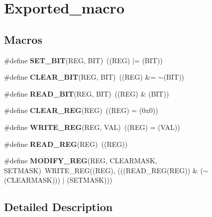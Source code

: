 \hypertarget{group___exported__macro}{\section{Exported\-\_\-macro}
\label{group___exported__macro}
}
\subsection*{Macros}
\begin{DoxyCompactItemize}
\item 
\hypertarget{group___exported__macro_ga26474f43799fbade9cf300e21dd3a91a}{\#define {\bfseries S\-E\-T\-\_\-\-B\-I\-T}(R\-E\-G, B\-I\-T)~((R\-E\-G) $|$= (B\-I\-T))}\label{group___exported__macro_ga26474f43799fbade9cf300e21dd3a91a}

\item 
\hypertarget{group___exported__macro_ga133aae6fc0d41bffab39ab223a7001de}{\#define {\bfseries C\-L\-E\-A\-R\-\_\-\-B\-I\-T}(R\-E\-G, B\-I\-T)~((R\-E\-G) \&= $\sim$(B\-I\-T))}\label{group___exported__macro_ga133aae6fc0d41bffab39ab223a7001de}

\item 
\hypertarget{group___exported__macro_ga822bb1bb9710d5f2fa6396b84e583c33}{\#define {\bfseries R\-E\-A\-D\-\_\-\-B\-I\-T}(R\-E\-G, B\-I\-T)~((R\-E\-G) \& (B\-I\-T))}\label{group___exported__macro_ga822bb1bb9710d5f2fa6396b84e583c33}

\item 
\hypertarget{group___exported__macro_ga1378fbdda39f40b85420df55f41460ef}{\#define {\bfseries C\-L\-E\-A\-R\-\_\-\-R\-E\-G}(R\-E\-G)~((R\-E\-G) = (0x0))}\label{group___exported__macro_ga1378fbdda39f40b85420df55f41460ef}

\item 
\hypertarget{group___exported__macro_ga32f78bffcaf6d13023dcd7f05e0c4d57}{\#define {\bfseries W\-R\-I\-T\-E\-\_\-\-R\-E\-G}(R\-E\-G, V\-A\-L)~((R\-E\-G) = (V\-A\-L))}\label{group___exported__macro_ga32f78bffcaf6d13023dcd7f05e0c4d57}

\item 
\hypertarget{group___exported__macro_gae7f188a4d26c9e713a48414783421071}{\#define {\bfseries R\-E\-A\-D\-\_\-\-R\-E\-G}(R\-E\-G)~((R\-E\-G))}\label{group___exported__macro_gae7f188a4d26c9e713a48414783421071}

\item 
\hypertarget{group___exported__macro_ga6553c99f510c3bab8cc0a91602053247}{\#define {\bfseries M\-O\-D\-I\-F\-Y\-\_\-\-R\-E\-G}(R\-E\-G, C\-L\-E\-A\-R\-M\-A\-S\-K, S\-E\-T\-M\-A\-S\-K)~W\-R\-I\-T\-E\-\_\-\-R\-E\-G((R\-E\-G), (((R\-E\-A\-D\-\_\-\-R\-E\-G(R\-E\-G)) \& ($\sim$(C\-L\-E\-A\-R\-M\-A\-S\-K))) $|$ (S\-E\-T\-M\-A\-S\-K)))}\label{group___exported__macro_ga6553c99f510c3bab8cc0a91602053247}

\end{DoxyCompactItemize}


\subsection{Detailed Description}
